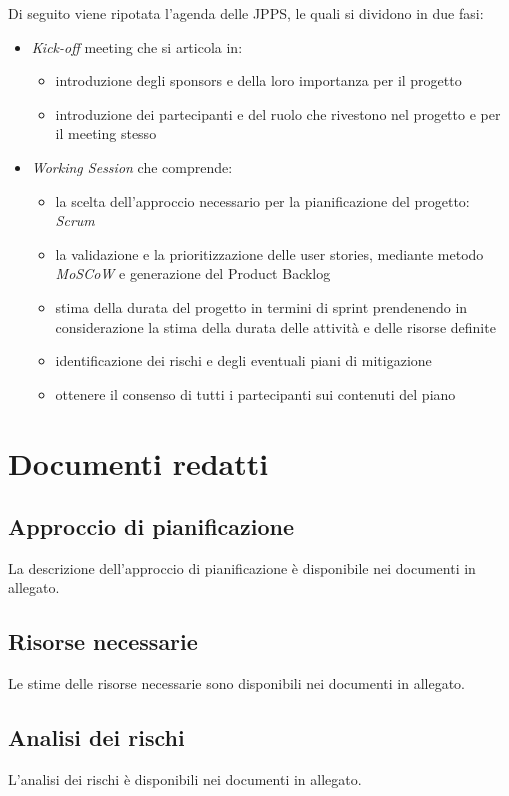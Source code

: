 Di seguito viene ripotata l'agenda delle JPPS, le quali si dividono in due fasi:
\begin{itemize}
    \item \textit{Kick-off} meeting che si articola in:
    \begin{itemize}
        \item introduzione degli sponsors e della loro importanza per il progetto
        \item introduzione dei partecipanti e del ruolo che rivestono nel progetto e per il 
        meeting stesso
    \end{itemize}
    \item \textit{Working Session} che comprende:
    \begin{itemize}
        \item la scelta dell'approccio necessario per la pianificazione del progetto: 
        \textit{Scrum}
        \item la validazione e la prioritizzazione delle user stories, mediante metodo \textit{MoSCoW} 
        e generazione del Product Backlog
        \item stima della durata del progetto in termini di sprint prendenendo in considerazione 
        la stima della durata delle attività e delle risorse definite
        \item identificazione dei rischi e degli eventuali piani di mitigazione
        \item ottenere il consenso di tutti i partecipanti sui contenuti del piano
    \end{itemize}
\end{itemize}


\section{Documenti redatti}

\subsection{Approccio di pianificazione}
La descrizione dell'approccio di pianificazione è disponibile nei documenti in allegato.

\subsection{Risorse necessarie}
Le stime delle risorse necessarie sono disponibili nei documenti in allegato.

\subsection{Analisi dei rischi}
L'analisi dei rischi è disponibili nei documenti in allegato.
